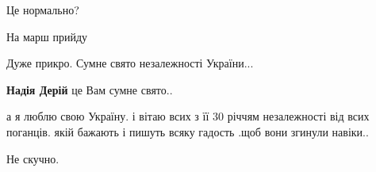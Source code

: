 \begin{itemize}
 
Це нормально?

 
На марш прийду

 
Дуже прикро. Сумне свято незалежності України...

\begin{itemize}
 
\textbf{Надія Дерій} це Вам сумне свято..

 

а я люблю свою Україну. і вітаю всих з її 30 річчям незалежності від всих
поганців. якій бажають і пишуть всяку гадость .щоб вони згинули навіки..

\end{itemize}

 
Не скучно.

 


\end{itemize}
